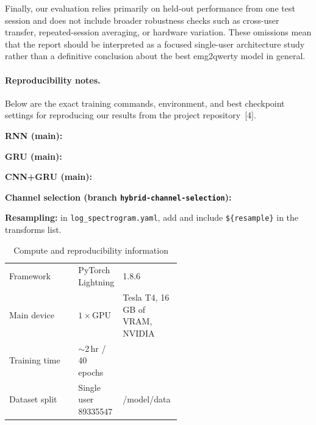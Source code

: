 \documentclass{article}
\begin{document}
Finally, our evaluation relies primarily on held-out performance from one test
session and does not include broader robustness checks such as cross-user
transfer, repeated-session averaging, or hardware variation. These omissions
mean that the report should be interpreted as a focused single-user architecture
study rather than a definitive conclusion about the best emg2qwerty model in
general.

\paragraph{Reproducibility notes.}

Below are the exact training commands, environment, and
best checkpoint settings for reproducing our results from the project
repository~[4]. 

\noindent\textbf{RNN (main):} \par
\noindent\textbf{GRU (main):} \par
\noindent\textbf{CNN+GRU (main):} \par
\noindent\textbf{Channel selection (branch \texttt{hybrid-channel-selection}):} \par
\noindent\textbf{Resampling:} in \texttt{log\_spectrogram.yaml}, add  and include \texttt{\$\{resample\}} in the transforms list.

\begin{table}[t]
	\caption{Compute and reproducibility information}
	\label{tab:compute}
	\centering
	\begin{tabular}{lp{0.22\linewidth}p{0.34\linewidth}}
		\toprule
		Framework     & PyTorch Lightning         & 1.8.6                           \\
		Main device   & $1\times$GPU              & Tesla T4, 16 GB of VRAM, NVIDIA \\
		Training time & ${\sim}$2\,hr / 40 epochs &                                 \\
		Dataset split & Single user 89335547      & /model/data                     \\
		\bottomrule
	\end{tabular}
\end{table}
\end{document}

